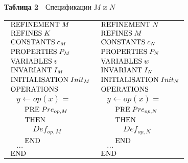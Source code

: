 \begin{multicols}{2}

{\small
\begin{center}
\vspace*{6pt}
\textbf{Таблица 2}\ \ Спецификации $M$ и $N$
\vspace*{2ex}

\begin{tabular}{|l|l|}
\hline
$\;\mbox{REFINEMENT}\; M$ & $\;\mbox{REFINEMENT}\; N$ \\
$\;\mbox{REFINES}\; K$ & $\;\mbox{REFINES}\; M$ \\
$\;\mbox{CONSTANTS}\; c_M$ & $\;\mbox{CONSTANTS}\; c_N$ \\
$\;\mbox{PROPERTIES}\; P_M$ & $\;\mbox{PROPERTIES}\; P_N$ \\
$\;\mbox{VARIABLES}\; v$ & $\;\mbox{VARIABLES}\; w$ \\
$\;\mbox{INVARIANT}\; I_M$ & $\;\mbox{INVARIANT}\; I_N$ \\
$\;\mbox{INITIALISATION}\; Init_M$ & $\;\mbox{INITIALISATION}\; Init_N$ \\
$\;\mbox{OPERATIONS}\;$ & $\;\mbox{OPERATIONS}\;$ \\
${}\quad y\leftarrow op(x)=$ & ${}\quad y\leftarrow op(x)=$ \\
${}\qquad \;\mbox{PRE}\; Pre_{op,M}$ & ${}\qquad \;\mbox{PRE}\; Pre_{op,N}$ \\
${}\qquad \;\mbox{THEN}\;$ & ${}\qquad \;\mbox{THEN}\;$ \\
${}\qquad \quad Def_{op,M}$ & ${}\qquad \quad Def_{op,N}$ \\
${}\qquad \;\mbox{END}\;$ & ${}\qquad \;\mbox{END}\;$ \\
${}\quad\dots$ & ${}\quad\dots$ \\
$\;\mbox{END}\;$ & $\;\mbox{END}\;$ \\
\hline
\end{tabular}
\vspace*{6pt}
\end{center}
}



\end{multicols}
